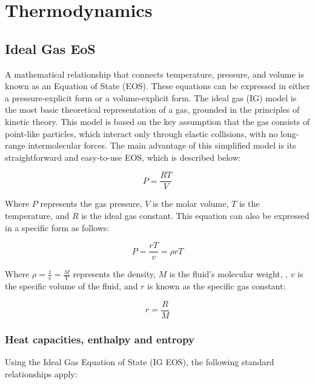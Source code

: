 \chapter{ Thermodynamics}
\chaptertoc{}

\section{Ideal Gas EoS}

A mathematical relationship that connects temperature, pressure, and volume is
known as an Equation of State (EOS). These equations can be expressed in either
a pressure-explicit form or a volume-explicit form. The ideal gas
(IG) model is the most basic theoretical representation of a gas, grounded in
the principles of kinetic theory. This model is based on the key assumption that
the gas consists of point-like particles, which interact only through elastic
collisions, with no long-range intermolecular forces. The main advantage of this
simplified model is its straightforward and easy-to-use EOS, which is described
below:

\begin{equation}
	P = \frac{RT}{V}
\end{equation}

Where $P$ represents the gas pressure, $V$ is the molar volume, $T$ is the
temperature, and $R$ is the ideal gas constant. This equation can also be
expressed in a specific form as follows:

\begin{equation}
	P = \frac{rT}{v} = \rho rT
\end{equation}

Where $\rho = \frac{1}{v}=\frac{M}{V}$ represents the density, $M$ is the fluid's molecular weight, , $v$ is the specific volume of the fluid, and $r$ is known as the specific gas constant:

\begin{equation}
	r = \frac{R}{M}
\end{equation}

	\subsection{Heat capacities, enthalpy and entropy}

	Using the Ideal Gas Equation of State (IG EOS), the following standard
	relationships apply:
	
